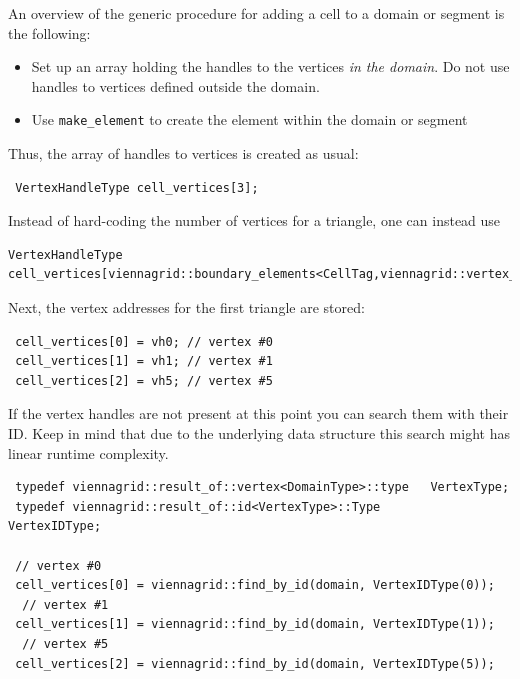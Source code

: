 

An overview of the generic procedure for adding a cell to a domain or segment is the following:
  \begin{itemize}
   \item Set up an array holding the handles to the vertices \emph{in the domain}. Do not use handles to vertices defined outside the domain.
   \item Use \lstinline|make_element| to create the element within the domain or segment
  \end{itemize}
Thus, the array of handles to vertices is created as usual:
\begin{lstlisting}
 VertexHandleType cell_vertices[3];
\end{lstlisting}
Instead of hard-coding the number of vertices for a triangle, one can instead use 
\begin{lstlisting}
VertexHandleType cell_vertices[viennagrid::boundary_elements<CellTag,viennagrid::vertex_tag>::num];
\end{lstlisting}


Next, the vertex addresses for the first triangle are stored:
\begin{lstlisting}
 cell_vertices[0] = vh0; // vertex #0
 cell_vertices[1] = vh1; // vertex #1
 cell_vertices[2] = vh5; // vertex #5
\end{lstlisting}


If the vertex handles are not present at this point you can search them with their ID. Keep in mind that due to the underlying data structure this search might has linear runtime complexity.
\begin{lstlisting}
 typedef viennagrid::result_of::vertex<DomainType>::type   VertexType;
 typedef viennagrid::result_of::id<VertexType>::Type       VertexIDType;
 
 // vertex #0
 cell_vertices[0] = viennagrid::find_by_id(domain, VertexIDType(0));
  // vertex #1
 cell_vertices[1] = viennagrid::find_by_id(domain, VertexIDType(1));
  // vertex #5
 cell_vertices[2] = viennagrid::find_by_id(domain, VertexIDType(5));
\end{lstlisting}

